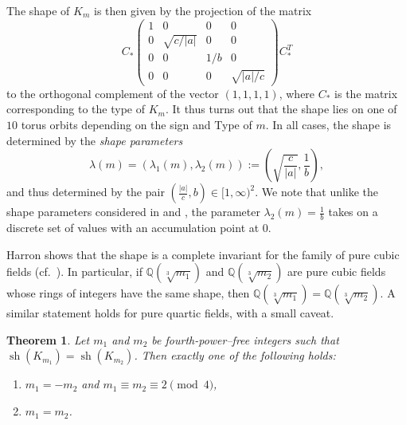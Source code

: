 \documentclass[table]{amsart}
\newtheorem{theorem}{Theorem}[section]
\newcommand{\Q}{\mathbb{Q}}
\numberwithin{equation}{section}
\begin{document}
\noindent The shape of $K_m$ is then given by the projection of the matrix
$$
C_\ast \begin{pmatrix}
1 & 0 & 0 & 0 \\
0 & \sqrt{c/|a|} & 0 & 0 \\
0 & 0 & 1/b & 0 \\
0 & 0 & 0 & \sqrt{|a|/c}
\end{pmatrix} C_\ast^T
$$
\noindent to the orthogonal complement of the vector $(1, 1, 1, 1)$, where $C_\ast$ is the matrix corresponding to the type of $K_m$. 
It thus turns out that the shape lies on one of $10$ torus orbits depending on the sign and Type of $m$. In all cases, the shape is determined by the \emph{shape parameters} 
\[\lambda(m)=(\lambda_1(m), \lambda_2(m)):=\left( \sqrt{\frac{c}{|a|}}, \frac{1}{b}\right),\] and thus determined by the pair $(\frac{|a|}{c}, b)\in [1, \infty)^2$. We note that unlike the shape parameters considered in \cite{Har17} and \cite{Hol22}, the parameter $\lambda_2(m)=\frac{1}{b}$ takes on a discrete set of values with an accumulation point at $0$. 

Harron shows that the shape is a complete invariant for the family of pure cubic fields (cf.~\cite[Theorem B]{Har17}). In particular, if $\Q(\!\sqrt[3]{m_1})$ and $\Q(\!\sqrt[3]{m_2})$ are pure cubic fields whose rings of integers have the same shape, then $\Q(\!\sqrt[3]{m_1})=\Q(\!\sqrt[3]{m_2})$. A similar statement holds for pure quartic fields, with a small caveat.

\begin{theorem}\label{shape complete invariant}
Let $m_1$ and $m_2$ be fourth-power--free integers such that $\operatorname{sh}(K_{m_1})=\operatorname{sh}(K_{m_2})$. Then exactly one of the following holds:
\begin{enumerate}
    \item $m_1=-m_2$ and $m_1\equiv m_2\equiv 2 \pmod{4}$,
    \item $m_1=m_2$.
\end{enumerate}
\end{theorem}
\end{document}
